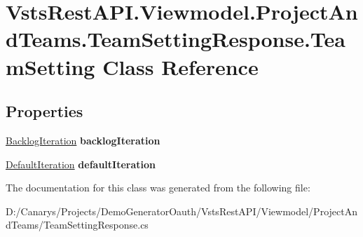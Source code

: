 \hypertarget{class_vsts_rest_a_p_i_1_1_viewmodel_1_1_project_and_teams_1_1_team_setting_response_1_1_team_setting}{}\section{Vsts\+Rest\+A\+P\+I.\+Viewmodel.\+Project\+And\+Teams.\+Team\+Setting\+Response.\+Team\+Setting Class Reference}
\label{class_vsts_rest_a_p_i_1_1_viewmodel_1_1_project_and_teams_1_1_team_setting_response_1_1_team_setting}
\subsection*{Properties}
\begin{DoxyCompactItemize}
\item 
\mbox{\label{class_vsts_rest_a_p_i_1_1_viewmodel_1_1_project_and_teams_1_1_team_setting_response_1_1_team_setting_a6acc011bee96d0dafceb4754c24d8710}} 
\mbox{\hyperlink{class_vsts_rest_a_p_i_1_1_viewmodel_1_1_project_and_teams_1_1_team_setting_response_1_1_backlog_iteration}{Backlog\+Iteration}} {\bfseries backlog\+Iteration}
\item 
\mbox{\label{class_vsts_rest_a_p_i_1_1_viewmodel_1_1_project_and_teams_1_1_team_setting_response_1_1_team_setting_a7b5f7c6453580e5553e2efc9dcef36b3}} 
\mbox{\hyperlink{class_vsts_rest_a_p_i_1_1_viewmodel_1_1_project_and_teams_1_1_team_setting_response_1_1_default_iteration}{Default\+Iteration}} {\bfseries default\+Iteration}
\end{DoxyCompactItemize}


The documentation for this class was generated from the following file\+:\begin{DoxyCompactItemize}
\item 
D\+:/\+Canarys/\+Projects/\+Demo\+Generator\+Oauth/\+Vsts\+Rest\+A\+P\+I/\+Viewmodel/\+Project\+And\+Teams/Team\+Setting\+Response.\+cs\end{DoxyCompactItemize}
